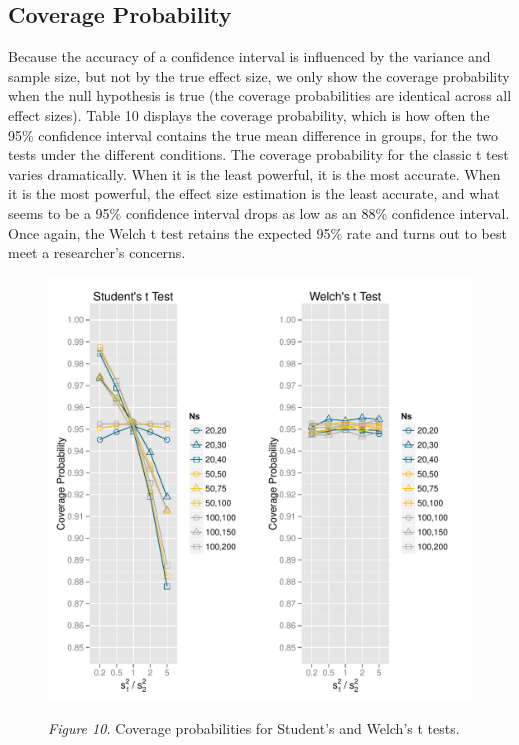 \documentclass[man,a4paper,noextraspace,apacite]{apa6}\usepackage[]{graphicx}\usepackage[]{color}
\makeatletter
\def\maxwidth{ %
  \ifdim\Gin@nat@width>\linewidth
    \linewidth
  \else
    \Gin@nat@width
  \fi
}
\newenvironment{knitrout}{}{} %
\makeatother
\begin{document}
\subsection{Coverage Probability}
Because the accuracy of a confidence interval is influenced by the variance and sample size, but not by the true effect size, we only show the coverage probability when the null hypothesis is true (the coverage probabilities are identical across all effect sizes). Table 10 displays the coverage probability, which is how often the 95\% confidence interval contains the true mean difference in groups, for the two tests under the different conditions. The coverage probability for the classic t test varies dramatically. When it is the least powerful, it is the most accurate. When it is the most powerful, the effect size estimation is the least accurate, and what seems to be a 95\% confidence interval drops as low as an 88\% confidence interval. Once again, the Welch t test retains the expected 95\% rate and turns out to best meet a researcher's concerns. 






\begin{figure}
\begin{knitrout}
\color{fgcolor}
\includegraphics[width=\maxwidth]{figure/coverage_plots} 

\end{knitrout}
\textit{Figure 10.} Coverage probabilities for Student's and Welch's t tests.
\end{figure}
\end{document}
